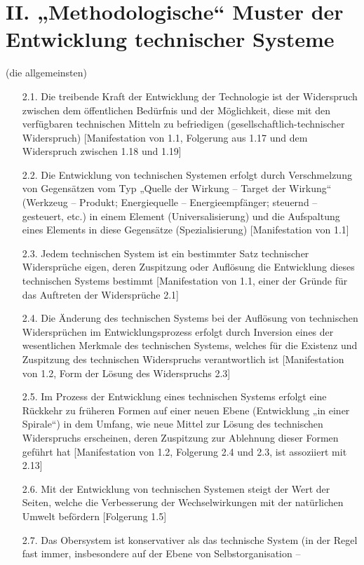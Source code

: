 \documentclass[11pt,a4paper]{article}
\begin{document}
\section*{II. „Methodologische“ Muster der Entwicklung technischer Systeme}
(die allgemeinsten)
\begin{itemize}\itemsep0pt
\item[2.1.] Die treibende Kraft der Entwicklung der Technologie ist der
  Widerspruch zwischen dem öffentlichen Bedürfnis und der Möglichkeit, diese
  mit den verfügbaren technischen Mitteln zu befriedigen
  (gesellschaftlich-technischer Widerspruch) [Manifestation von 1.1, Folgerung
    aus 1.17 und dem Widerspruch zwischen 1.18 und 1.19]
\item[2.2.] Die Entwicklung von technischen Systemen erfolgt durch
  Verschmelzung von Gegensätzen vom Typ „Quelle der Wirkung -- Target der
  Wirkung“ (Werkzeug -- Produkt; Energiequelle -- Energieempfänger; steuernd
  -- gesteuert, etc.) in einem Element (Universalisierung) und die Aufspaltung
  eines Elements in diese Gegensätze (Spezialisierung) [Manifestation von 1.1]
\item[2.3.] Jedem technischen System ist ein bestimmter Satz technischer
  Widersprüche eigen, deren Zuspitzung oder Auflösung die Entwicklung dieses
  technischen Systems bestimmt [Manifestation von 1.1, einer der Gründe für
    das Auftreten der Widersprüche 2.1]
\item[2.4.] Die Änderung des technischen Systems bei der Auflösung von
  technischen Widersprüchen im Entwicklungsprozess erfolgt durch Inversion
  eines der wesentlichen Merkmale des technischen Systems, welches für die
  Existenz und Zuspitzung des technischen Widerspruchs verantwortlich ist
  [Manifestation von 1.2, Form der Lösung des Widerspruchs 2.3]
\item[2.5.] Im Prozess der Entwicklung eines technischen Systems erfolgt eine
  Rückkehr zu früheren Formen auf einer neuen Ebene (Entwicklung „in einer
  Spirale“) in dem Umfang, wie neue Mittel zur Lösung des technischen
  Widerspruchs erscheinen, deren Zuspitzung zur Ablehnung dieser Formen
  geführt hat [Manifestation von 1.2, Folgerung 2.4 und 2.3, ist assoziiert
    mit 2.13]
\item[2.6.] Mit der Entwicklung von technischen Systemen steigt der Wert der
  Seiten, welche die Verbesserung der Wechselwirkungen mit der natürlichen
  Umwelt befördern [Folgerung 1.5]
\item[2.7.] Das Obersystem ist konservativer als das technische System (in der
  Regel fast immer, insbesondere auf der Ebene von Selbstorganisation --

\end{itemize}
\end{document}
